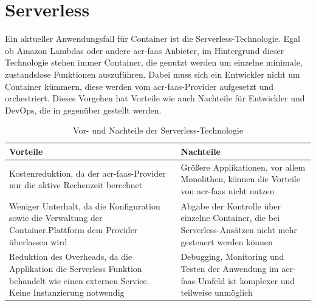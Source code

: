 \section{Serverless}
\label{sec:aktuellesServerless}

Ein aktueller Anwendungsfall für Container ist die Serverless-Technologie. Egal ob Amazon Lambdas oder andere \gls{acr-faas} Anbieter, im Hintergrund dieser Technologie stehen immer Container, die genutzt werden um einzelne minimale, zustandslose Funktionen auszuführen. Dabei muss sich ein Entwickler nicht um Container kümmern, diese werden vom \gls{acr-faas}-Provider aufgesetzt und orchestriert. Dieses Vorgehen hat Vorteile wie auch Nachteile für Entwickler und DevOps, die in  gegenüber gestellt werden.

\begin{table}[h]
	\renewcommand{\arraystretch}{2.5}
	\begin{center}
		\begin{tabu} to 0.9
			\toprule
			Vorteile & Nachteile\\
			\midrule
			Kostenreduktion, da der \gls{acr-faas}-Provider nur die aktive Rechenzeit berechnet & Größere Applikationen, vor allem Monolithen, können die Vorteile von \gls{acr-faas} nicht nutzen\\
			Weniger Unterhalt, da die Konfiguration sowie die Verwaltung der Container.Plattform dem Provider überlassen wird & Abgabe der Kontrolle über einzelne Container, die bei Serverless-Ansätzen nicht mehr gesteuert werden können\\
			Reduktion des Overheads, da die Applikation die Serverless Funktion behandelt wie einen externen Service. Keine Instanzierung notwendig & Debugging, Monitoring und Testen der Anwendung im \gls{acr-faas}-Umfeld ist komplexer und teilweise unmöglich\\
			\bottomrule
		\end{tabu}
		\caption{Vor- und Nachteile der Serverless-Technologie \citep{ContainersVsServerlessComputing}}
		\label{tab:serverlessAdvantagesDisadvantages}
	\end{center}
\end{table}

